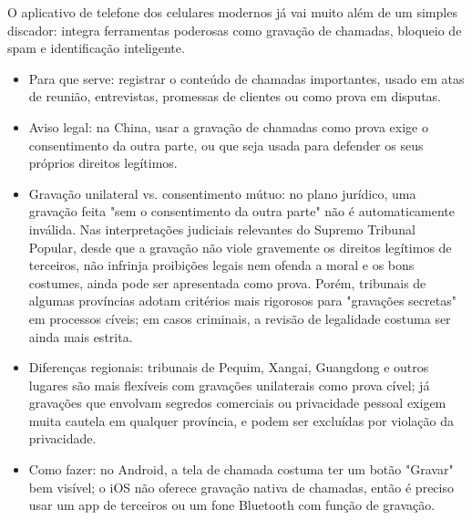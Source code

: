 


O aplicativo de telefone dos celulares modernos já vai muito além de um simples discador: integra ferramentas poderosas como gravação de chamadas, bloqueio de spam e identificação inteligente.


\begin{itemize}
  \item Para que serve: registrar o conteúdo de chamadas importantes, usado em atas de reunião, entrevistas, promessas de clientes ou como prova em disputas.
  \item Aviso legal: na China, usar a gravação de chamadas como prova exige o consentimento da outra parte, ou que seja usada para defender os seus próprios direitos legítimos.
  \item Gravação unilateral vs. consentimento mútuo: no plano jurídico, uma gravação feita "sem o consentimento da outra parte" não é automaticamente inválida. Nas interpretações judiciais relevantes do Supremo Tribunal Popular, desde que a gravação não viole gravemente os direitos legítimos de terceiros, não infrinja proibições legais nem ofenda a moral e os bons costumes, ainda pode ser apresentada como prova. Porém, tribunais de algumas províncias adotam critérios mais rigorosos para "gravações secretas" em processos cíveis; em casos criminais, a revisão de legalidade costuma ser ainda mais estrita.
  \item Diferenças regionais: tribunais de Pequim, Xangai, Guangdong e outros lugares são mais flexíveis com gravações unilaterais como prova cível; já gravações que envolvam segredos comerciais ou privacidade pessoal exigem muita cautela em qualquer província, e podem ser excluídas por violação da privacidade.
  \item Como fazer: no Android, a tela de chamada costuma ter um botão "Gravar" bem visível; o iOS não oferece gravação nativa de chamadas, então é preciso usar um app de terceiros ou um fone Bluetooth com função de gravação.
\end{itemize}


